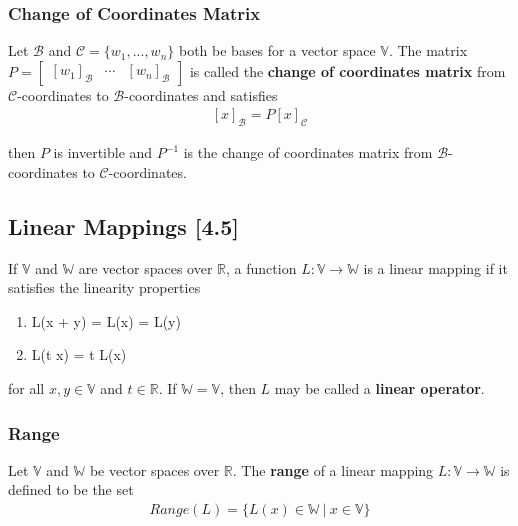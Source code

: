 \documentclass[a4paper,9pt]{extarticle}
\begin{document}
\begin{multicols*}{2}

\subsubsection{Change of Coordinates Matrix}
Let $\mathcal{B}$ and $\mathcal{C} = \{w_1, ..., w_n\}$ both be bases for a vector space $\mathbb{V}$. The matrix $P = \begin{bmatrix}[w_1]_{\mathcal{B}} & \cdots & [w_n]_{\mathcal{B}}\end{bmatrix}$ is called the \textbf{change of coordinates matrix} from $\mathcal{C}$-coordinates to $\mathcal{B}$-coordinates and satisfies 
\begin{equation} \label{4.3-3}
    \begin{split}
        [x]_{\mathcal{B}} = P [x]_{\mathcal{C}}
    \end{split}
\end{equation}

\noindent then $P$ is invertible and $P^{-1}$ is the change of coordinates matrix from $\mathcal{B}$-coordinates to $\mathcal{C}$-coordinates.


\subsection{Linear Mappings [4.5]}
If $\mathbb{V}$ and $\mathbb{W}$ are vector spaces over $\mathbb{R}$, a function $L : \mathbb{V} \to \mathbb{W}$ is a linear mapping if it satisfies the linearity properties
\begin{enumerate}[label=\bfseries L\arabic*] \itemsep0pt \parskip0pt 
    \item L(x + y) = L(x) = L(y)
    \item L(t x) = t L(x)
\end{enumerate}
for all $x, y \in \mathbb{V}$ and $t \in \mathbb{R}$. If $\mathbb{W} = \mathbb{V}$, then $L$ may be called a \textbf{linear operator}.


\subsubsection{Range}
Let $\mathbb{V}$ and $\mathbb{W}$ be vector spaces over $\mathbb{R}$. The \textbf{range} of a linear mapping $L: \mathbb{V} \to \mathbb{W}$ is defined to be the set
\begin{equation} \label{4.5-1}
    \begin{split}
        Range(L) = \{L(x) \in \mathbb{W} \> | \> x \in \mathbb{V}\}
    \end{split}
\end{equation}


\end{multicols*}
\end{document}
